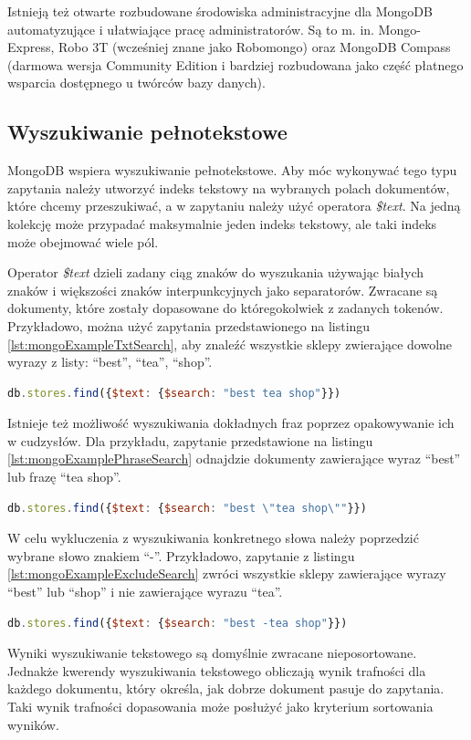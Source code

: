 Istnieją też otwarte rozbudowane środowiska administracyjne dla MongoDB automatyzujące i ułatwiające pracę administratorów.
Są to m. in. Mongo-Express, Robo 3T (wcześniej znane jako Robomongo) oraz MongoDB Compass (darmowa wersja Community Edition i bardziej rozbudowana jako część płatnego wsparcia dostępnego u twórców bazy danych).

\subsection{Wyszukiwanie pełnotekstowe}

MongoDB wspiera wyszukiwanie pełnotekstowe.
Aby móc wykonywać tego typu zapytania należy utworzyć indeks tekstowy na wybranych polach dokumentów, które chcemy przeszukiwać, a w zapytaniu należy użyć operatora \textit{\$text}.
Na jedną kolekcję może przypadać maksymalnie jeden indeks tekstowy, ale taki indeks może obejmować wiele pól.

Operator \textit{\$text} dzieli zadany ciąg znaków do wyszukania używając białych znaków i większości znaków interpunkcyjnych jako separatorów.
Zwracane są dokumenty, które zostały dopasowane do któregokolwiek z zadanych tokenów.
Przykładowo, można użyć zapytania przedstawionego na listingu \ref{lst:mongoExampleTxtSearch}, aby znaleźć wszystkie sklepy zwierające dowolne wyrazy z listy: \enquote{best}, \enquote{tea}, \enquote{shop}.

\begin{lstlisting}[language=JavaScript,caption={Zapytanie wykonujące wyszukiwanie pełnotekstowe},label={lst:mongoExampleTxtSearch}]
db.stores.find({$text: {$search: "best tea shop"}})
\end{lstlisting}

Istnieje też możliwość wyszukiwania dokładnych fraz poprzez opakowywanie ich w cudzysłów. 
Dla przykładu, zapytanie przedstawione na listingu \ref{lst:mongoExamplePhraseSearch}
odnajdzie dokumenty zawierające wyraz \enquote{best} lub frazę \enquote{tea shop}.

\begin{lstlisting}[language=JavaScript,
caption={Zapytanie dopasowujące dokładną frazę},
label={lst:mongoExamplePhraseSearch}]
db.stores.find({$text: {$search: "best \"tea shop\""}})
\end{lstlisting}

W celu wykluczenia z wyszukiwania konkretnego słowa należy poprzedzić wybrane słowo znakiem \enquote{-}.
Przykładowo, zapytanie z listingu \ref{lst:mongoExampleExcludeSearch} zwróci wszystkie sklepy zawierające wyrazy \enquote{best} lub \enquote{shop} i nie zawierające wyrazu \enquote{tea}.

\begin{lstlisting}[language=JavaScript,
caption={Zapytanie wykluczające wyraz \enquote{tea}},
label={lst:mongoExampleExcludeSearch}]
db.stores.find({$text: {$search: "best -tea shop"}})
\end{lstlisting}

Wyniki wyszukiwanie tekstowego są domyślnie zwracane nieposortowane. 
Jednakże kwerendy wyszukiwania tekstowego obliczają wynik trafności dla każdego dokumentu, który określa, jak dobrze dokument pasuje do zapytania.
Taki wynik trafności dopasowania może posłużyć jako kryterium sortowania wyników.